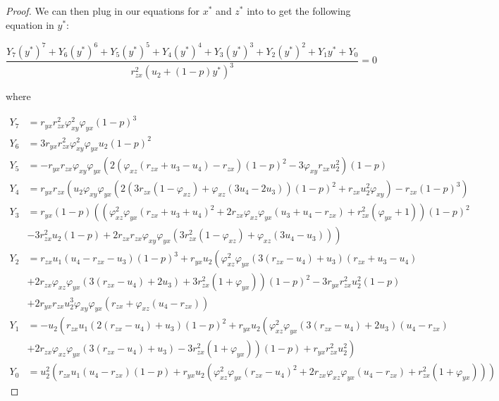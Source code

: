 \begin{proof}
    We can then plug in our equations for $x^*$ and $z^*$ into  to get the following equation in $y^*$:

    \begin{equation}\label{eq:interior-Y}
        \frac{Y_7\left(y^*\right)^7+Y_6\left(y^*\right)^6+Y_5\left(y^*\right)^5+Y_4\left(y^*\right)^4+Y_3\left(y^*\right)^3+Y_2\left(y^*\right)^2+Y_1y^*+Y_0}{r_{zx}^2\left(u_2+\left(1-p\right)y^*\right)^3}=0
    \end{equation}

    where

    \begin{align*}
        Y_7 &= r_{yx}r_{zx}^2\varphi_{xy}^2\varphi_{yx}\left(1-p\right)^3\\
        Y_6 &= 3r_{yx}r_{zx}^2\varphi_{xy}^2\varphi_{yx}u_2\left(1-p\right)^2\\
        Y_5 &= -r_{yx}r_{zx}\varphi_{xy}\varphi_{yx}\left(2\left(\varphi_{xz}\left(r_{zx}+u_3-u_4\right)-r_{zx}\right)\left(1-p\right)^2-3\varphi_{xy}r_{zx}u_2^2\right)\left(1-p\right)\\
        Y_4 &= r_{yx}r_{zx}\left(u_2\varphi_{xy}\varphi_{yx}\left(2\left(3r_{zx}\left(1-\varphi_{xz}\right)+\varphi_{xz}\left(3u_4-2u_3\right)\right)\left(1-p\right)^2+r_{zx}u_2^2\varphi_{xy}\right)-r_{zx}\left(1-p\right)^3\right)\\
        Y_3 &= r_{yx}\left(1-p\right)\left(\left(\varphi_{xz}^2\varphi_{yx}\left(r_{zx}+u_3+u_4\right)^2+2r_{zx}\varphi_{xz}\varphi_{yx}\left(u_3+u_4-r_{zx}\right)+r_{zx}^2\left(\varphi_{yx}+1\right)\right)\left(1-p\right)^2\right.\\
        &\left.-3r_{zx}^2u_2\left(1-p\right)+2r_{zx}r_{zx}\varphi_{xy}\varphi_{yx}\left(3r_{zx}^2\left(1-\varphi_{xz}\right)+\varphi_{xz}\left(3u_4-u_3\right)\right)\right)\\
        Y_2 &= r_{zx}u_1\left(u_4-r_{zx}-u_3\right)\left(1-p\right)^3+r_{yx}u_2\left(\varphi_{xz}^2\varphi_{yx}\left(3\left(r_{zx}-u_4\right)+u_3\right)\left(r_{zx}+u_3-u_4\right)\right.\\
        &\left.+2r_{zx}\varphi_{xz}\varphi_{yx}\left(3\left(r_{zx}-u_4\right)+2u_3\right)+3r_{zx}^2\left(1+\varphi_{yx}\right)\right)\left(1-p\right)^2-3r_{yx}r_{zx}^2u_2^2\left(1-p\right)\\
        &+2r_{yx}r_{zx}u_2^3\varphi_{xy}\varphi_{yx}\left(r_{zx}+\varphi_{xz}\left(u_4-r_{zx}\right)\right)\\
        Y_1 &= -u_2\left(r_{zx}u_1\left(2\left(r_{zx}-u_4\right)+u_3\right)\left(1-p\right)^2+r_{yx}u_2\left(\varphi_{xz}^2\varphi_{yx}\left(3\left(r_{zx}-u_4\right)+2u_3\right)\left(u_4-r_{zx}\right)\right.\right.\\
        &\left.\left.+2r_{zx}\varphi_{xz}\varphi_{yx}\left(3\left(r_{zx}-u_4\right)+u_3\right)-3r_{zx}^2\left(1+\varphi_{yx}\right)\right)\left(1-p\right)+r_{yx}r_{zx}^2u_2^2\right)\\
        Y_0 &= u_2^2\left(r_{zx}u_1\left(u_4-r_{zx}\right)\left(1-p\right)+r_{yx}u_2\left(\varphi_{xz}^2\varphi_{yx}\left(r_{zx}-u_4\right)^2+2r_{zx}\varphi_{xz}\varphi_{yx}\left(u_4-r_{zx}\right)+r_{zx}^2\left(1+\varphi_{yx}\right)\right)\right)
    \end{align*}


\end{proof}
